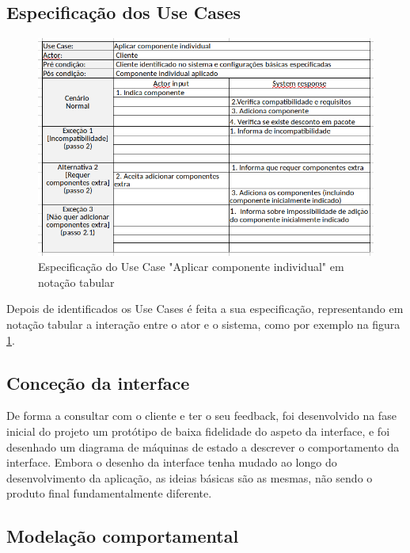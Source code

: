 \documentclass{llncs}
\begin{document}
\subsection{Especificação dos Use Cases}

\begin{figure}
\begin{center}
\includegraphics[scale=0.40]{aplicar_componente_tabular.png} 
\end{center}
\caption{\label{fig:notacao_tabular}Especificação do Use Case "Aplicar componente individual" em notação tabular }
\end{figure} 

Depois de identificados os Use Cases é feita a sua especificação, representando em notação tabular a interação entre o ator e o sistema, como por exemplo na figura \ref{fig:notacao_tabular}.

\subsection{Conceção da interface}

De forma a consultar com o cliente e ter o seu feedback, foi desenvolvido na fase inicial do projeto um protótipo de baixa fidelidade do aspeto da interface, e foi desenhado um diagrama de máquinas de estado a descrever o comportamento da interface. Embora o desenho da interface tenha mudado ao longo do desenvolvimento da aplicação, as ideias básicas são as mesmas, não sendo o produto final fundamentalmente diferente.

\subsection{Modelação comportamental}
\end{document}
